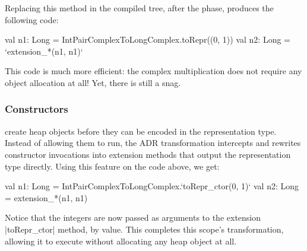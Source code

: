 Replacing this method in the compiled tree, after the \commit{} phase, produces the following code:

\begin{lstlisting-nobreak}
val n1: Long = IntPairComplexToLongComplex.toRepr((0, 1))
val n2: Long = `extension_*(n1, n1)`
\end{lstlisting-nobreak}

This code is much more efficient: the complex multiplication does not require any object allocation at all! Yet, there is still a snag.

\subsubsection{Constructors} create heap objects before they can be encoded in the representation type. Instead of allowing them to run, the ADR transformation intercepts and rewrites constructor invocations into extension methods that output the representation type directly. Using this feature on the code above, we get:

\begin{lstlisting-nobreak}
val n1: Long = IntPairComplexToLongComplex.`toRepr_ctor(0, 1)`
val n2: Long = extension_*(n1, n1)
\end{lstlisting-nobreak}

Notice that the integers are now passed as arguments to the extension |toRepr_ctor| method, by value. This completes this scope's transformation, allowing it to execute without allocating any heap object at all.



